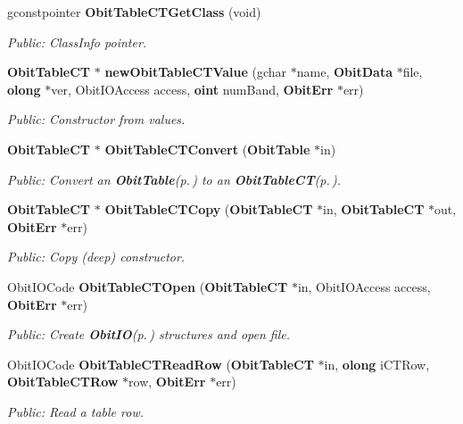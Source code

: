 \begin{CompactItemize}
gconstpointer {\bf Obit\-Table\-CTGet\-Class} (void)
\begin{CompactList}\small\item\em Public: Class\-Info pointer. \item\end{CompactList}\item 
{\bf Obit\-Table\-CT} $\ast$ {\bf new\-Obit\-Table\-CTValue} (gchar $\ast$name, {\bf Obit\-Data} $\ast$file, {\bf olong} $\ast$ver, Obit\-IOAccess access, {\bf oint} num\-Band, {\bf Obit\-Err} $\ast$err)
\begin{CompactList}\small\item\em Public: Constructor from values. \item\end{CompactList}\item 
{\bf Obit\-Table\-CT} $\ast$ {\bf Obit\-Table\-CTConvert} ({\bf Obit\-Table} $\ast$in)
\begin{CompactList}\small\item\em Public: Convert an {\bf Obit\-Table}{\rm (p.\,\pageref{structObitTable})} to an {\bf Obit\-Table\-CT}{\rm (p.\,\pageref{structObitTableCT})}. \item\end{CompactList}\item 
{\bf Obit\-Table\-CT} $\ast$ {\bf Obit\-Table\-CTCopy} ({\bf Obit\-Table\-CT} $\ast$in, {\bf Obit\-Table\-CT} $\ast$out, {\bf Obit\-Err} $\ast$err)
\begin{CompactList}\small\item\em Public: Copy (deep) constructor. \item\end{CompactList}\item 
Obit\-IOCode {\bf Obit\-Table\-CTOpen} ({\bf Obit\-Table\-CT} $\ast$in, Obit\-IOAccess access, {\bf Obit\-Err} $\ast$err)
\begin{CompactList}\small\item\em Public: Create {\bf Obit\-IO}{\rm (p.\,\pageref{structObitIO})} structures and open file. \item\end{CompactList}\item 
Obit\-IOCode {\bf Obit\-Table\-CTRead\-Row} ({\bf Obit\-Table\-CT} $\ast$in, {\bf olong} i\-CTRow, {\bf Obit\-Table\-CTRow} $\ast$row, {\bf Obit\-Err} $\ast$err)
\begin{CompactList}\small\item\em Public: Read a table row. \item\end{CompactList}\item 

\end{CompactItemize}
